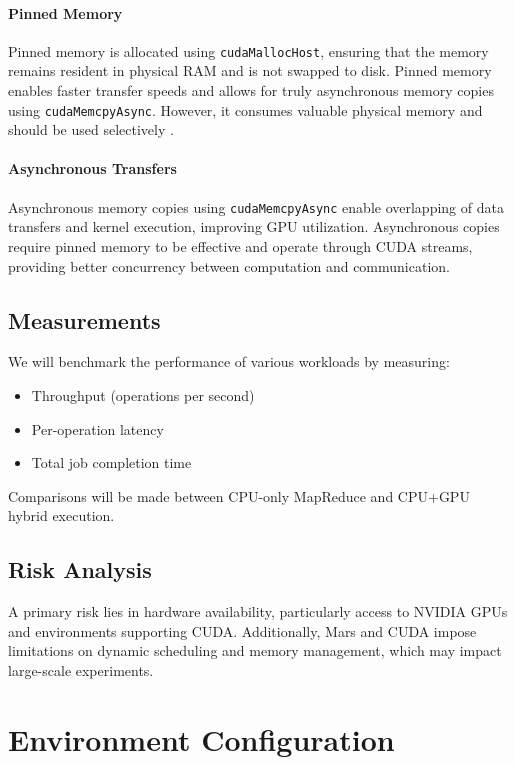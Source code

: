\documentclass{article}
\begin{document}
\paragraph{Pinned Memory} Pinned memory is allocated using \texttt{cudaMallocHost}, ensuring that the memory remains resident in physical RAM and is not swapped to disk. Pinned memory enables faster transfer speeds and allows for truly asynchronous memory copies using \texttt{cudaMemcpyAsync}. However, it consumes valuable physical memory and should be used selectively \cite{cuda_forum_async}.

\paragraph{Asynchronous Transfers} Asynchronous memory copies using \texttt{cudaMemcpyAsync} enable overlapping of data transfers and kernel execution, improving GPU utilization. Asynchronous copies require pinned memory to be effective and operate through CUDA streams, providing better concurrency between computation and communication.

\subsection{Measurements}
We will benchmark the performance of various workloads by measuring:
\begin{itemize}
    \item Throughput (operations per second)
    \item Per-operation latency
    \item Total job completion time
\end{itemize}

Comparisons will be made between CPU-only MapReduce and CPU+GPU hybrid execution.

\subsection{Risk Analysis}
A primary risk lies in hardware availability, particularly access to NVIDIA GPUs and environments supporting CUDA. Additionally, Mars and CUDA impose limitations on dynamic scheduling and memory management, which may impact large-scale experiments.

\section{Environment Configuration}
\end{document}
